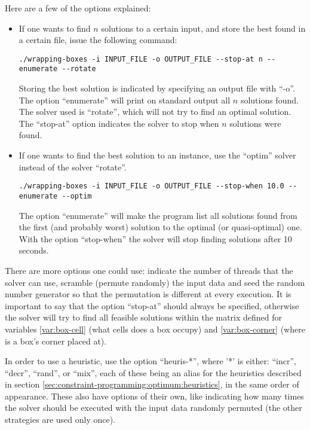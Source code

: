 Here are a few of the options explained:
\begin{itemize}
	\item If one wants to find $n$ solutions to a certain input, and store the
	best found in a certain file, issue the following command:
\begin{verbatim}
./wrapping-boxes -i INPUT_FILE -o OUTPUT_FILE --stop-at n --enumerate --rotate
\end{verbatim}
	
	Storing the best solution is indicated by specifying an output file with ``-o''.
	The option ``enumerate'' will print on standard output all $n$ solutions found.
	The solver used is ``rotate'', which will not try to find an optimal solution.
	The ``stop-at'' option indicates the solver to stop when $n$ solutions were
	found.
	
	\item If one wants to find the best solution to an instance, use the ``optim'' solver
	instead of the solver ``rotate''.
\begin{verbatim}
./wrapping-boxes -i INPUT_FILE -o OUTPUT_FILE --stop-when 10.0 --enumerate --optim
\end{verbatim}
	
	The option ``enumerate'' will make the program list all solutions found from
	the first (and probably worst) solution to the optimal (or quasi-optimal) one.
	With the option ``stop-when'' the solver will stop finding solutions after 10 seconds.
\end{itemize}

There are more options one could use: indicate the number of threads that the solver
can use, scramble (permute randomly) the input data and seed the random number generator
so that the permutation is different at every execution. It is important to say that
the option ``stop-at'' should always be specified, otherwise the solver will try to
find all feasible solutions within the matrix defined for variables \ref{var:box-cell}
(what cells does a box occupy) and \ref{var:box-corner} (where is a box's corner placed at).

\hfill

In order to use a heuristic, use the option ``heuris-*'', where '*' is either: ``incr'',
``decr'', ``rand'', or ``mix'', each of these being an alias for the heuristics
described in section \ref{sec:constraint-programming:optimum:heuristics}, in the same
order of appearance. These also have options of their own, like indicating how many
times the solver should be executed with the input data randomly permuted (the other
strategies are used only once).

